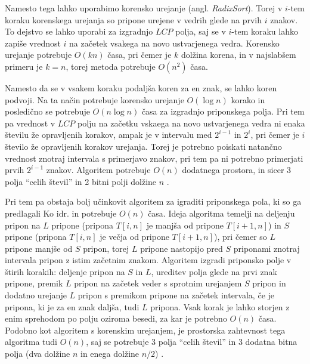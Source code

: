 Namesto tega lahko uporabimo korensko urejanje (angl. \textit{RadixSort}). Torej v $i$-tem koraku korenskega urejanja so pripone urejene v vedrih glede na prvih $i$ znakov. To dejstvo se lahko uporabi za izgradnjo $LCP$ polja, saj se v $i$-tem koraku lahko zapiše vrednost $i$ na začetek vsakega na novo ustvarjenega vedra. Korensko urejanje potrebuje $O(kn)$ časa, pri čemer je $k$ dolžina korena, in v najslabšem primeru je $k=n$, torej metoda potrebuje $O(n^2)$ časa.

Namesto da se v vsakem koraku podaljša koren za en znak, se lahko koren podvoji. Na ta način potrebuje korensko urejanje $O(\log{n})$ korako in posledično se potrebuje $O(n\log{n})$ časa za izgradnjo priponskega polja. Pri tem pa vrednost v $LCP$ polju na začetku vskaega na novo ustvarjenega vedra ni enaka številu že opravljenih korakov, ampak je v intervalu med $2^{i-1}$ in $2^{i}$, pri čemer je $i$ število že opravljenih korakov urejanja. Torej je potrebno poiskati natančno vrednost znotraj intervala s primerjavo znakov, pri tem pa ni potrebno primerjati prvih $2^{i-1}$ znakov. Algoritem potrebuje $O(n)$ dodatnega prostora, in sicer 3 polja \enquote{celih števil} in 2 bitni polji dolžine $n$ \cite{Manber1990}.


Pri tem pa obstaja bolj učinkovit algoritem za igraditi priponskega pola, ki so ga predlagali Ko idr. \cite{Ko2005} in potrebuje $O(n)$ časa. Ideja algoritma temelji na deljenju pripon na $L$ pripone (pripona $T[i,n]$ je manjša od pripone $T[i+1,n]$) in $S$ pripone (pripona $T[i,n]$ je večja od pripone $T[i+1,n]$), pri čemer so $L$ pripone manjše od $S$ pripon, torej $L$ pripone nastopijo pred $S$ priponami znotraj intervala pripon z istim začetnim znakom. Algoritem izgradi priponsko polje v štirih korakih: deljenje pripon na $S$ in $L$, ureditev polja glede na prvi znak pripone, premik $L$ pripon na začetek veder s sprotnim urejanjem $S$ pripon in dodatno urejanje $L$ pripon s premikom pripone na začetek intervala, če je pripona, ki je za en znak daljša, tudi $L$ pripona. Vsak korak je lahko storjen z enim sprehodom po polju oziroma besedi, za kar je potrebno $O(n)$ časa. Podobno kot algoritem s korenskim urejanjem, je prostorska zahtevnost tega algoritma tudi $O(n)$, saj se potrebuje 3 polja \enquote{celih števil} in 3 dodatna bitna polja (dva dolžine $n$ in enega dolžine $n/2$) \cite{Ko2005}.